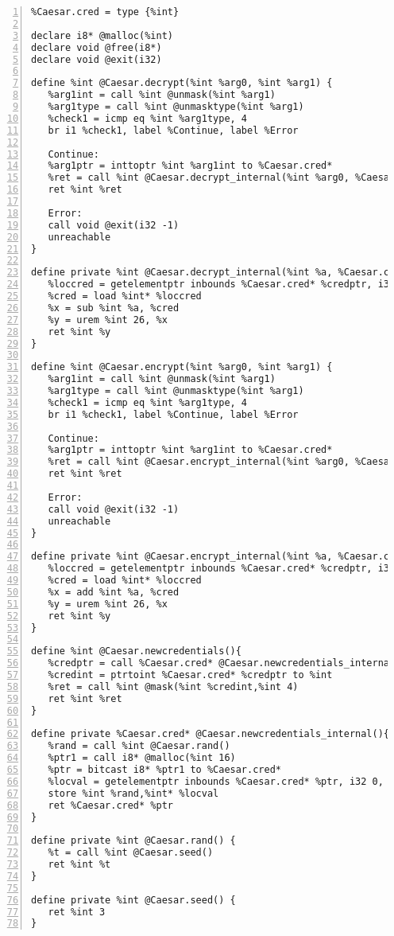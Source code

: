 \begin{lstlisting}[frame=single,numbers=left, language={[x86masm]Assembler}, caption={[LLVM Translation Caesar Cipher Example]LLVM IR for the example.},
label=llvm:Example]
%int = type i64
%Caesar.cred = type {%int}

declare i8* @malloc(%int)
declare void @free(i8*)
declare void @exit(i32)

define %int @Caesar.decrypt(%int %arg0, %int %arg1) {
   %arg1int = call %int @unmask(%int %arg1)
   %arg1type = call %int @unmasktype(%int %arg1)
   %check1 = icmp eq %int %arg1type, 4
   br i1 %check1, label %Continue, label %Error
   
   Continue:
   %arg1ptr = inttoptr %int %arg1int to %Caesar.cred*
   %ret = call %int @Caesar.decrypt_internal(%int %arg0, %Caesar.cred* %arg1ptr)
   ret %int %ret
   
   Error:
   call void @exit(i32 -1)
   unreachable
}

define private %int @Caesar.decrypt_internal(%int %a, %Caesar.cred* %credptr) {
   %loccred = getelementptr inbounds %Caesar.cred* %credptr, i32 0, i32 0
   %cred = load %int* %loccred 
   %x = sub %int %a, %cred
   %y = urem %int 26, %x 
   ret %int %y
}

define %int @Caesar.encrypt(%int %arg0, %int %arg1) {
   %arg1int = call %int @unmask(%int %arg1)
   %arg1type = call %int @unmasktype(%int %arg1)
   %check1 = icmp eq %int %arg1type, 4
   br i1 %check1, label %Continue, label %Error
   
   Continue:
   %arg1ptr = inttoptr %int %arg1int to %Caesar.cred*
   %ret = call %int @Caesar.encrypt_internal(%int %arg0, %Caesar.cred* %arg1ptr)
   ret %int %ret
   
   Error:
   call void @exit(i32 -1)
   unreachable
}

define private %int @Caesar.encrypt_internal(%int %a, %Caesar.cred* %credptr) {
   %loccred = getelementptr inbounds %Caesar.cred* %credptr, i32 0, i32 0
   %cred = load %int* %loccred
   %x = add %int %a, %cred
   %y = urem %int 26, %x
   ret %int %y
}

define %int @Caesar.newcredentials(){
   %credptr = call %Caesar.cred* @Caesar.newcredentials_internal()
   %credint = ptrtoint %Caesar.cred* %credptr to %int
   %ret = call %int @mask(%int %credint,%int 4)
   ret %int %ret
}

define private %Caesar.cred* @Caesar.newcredentials_internal(){
   %rand = call %int @Caesar.rand()
   %ptr1 = call i8* @malloc(%int 16)
   %ptr = bitcast i8* %ptr1 to %Caesar.cred*
   %locval = getelementptr inbounds %Caesar.cred* %ptr, i32 0, i32 0
   store %int %rand,%int* %locval
   ret %Caesar.cred* %ptr
}

define private %int @Caesar.rand() {
   %t = call %int @Caesar.seed()
   ret %int %t
}

define private %int @Caesar.seed() {
   ret %int 3
}
\end{lstlisting}


